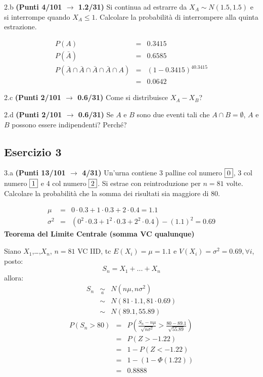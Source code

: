 \documentclass[
  11pt,
]{book}
\theoremstyle{mytheoremstyle}
\theoremstyle{mydefstyle}
\newenvironment{sol}
  {
  \begin{tcolorbox}[enhanced,breakable,arc=0.1mm,boxrule=1pt,colback=white,colframe=iblue,
  title=\bf \fontfamily{lmss}\selectfont \hspace{.5 cm} Soluzione,drop fuzzy shadow]

}{
\end{tcolorbox}
  }
\begin{document}
2.b \textbf{(Punti 4/101 \(\rightarrow\) 1.2/31)} Si continua ad estrarre da \(X_A\sim N(1.5,1.5)\) e si interrompe quando \(X_A\le 1\). Calcolare la probabilità di interrompere alla quinta estrazione.

\begin{sol}
\begin{eqnarray*}
  P(A) &=&  0.3415\\
  P(\bar A) &=& 0.6585\\
  P(\bar A\cap \bar A\cap\bar A\cap\bar A\cap A)&=& (1-0.3415)^40.3415\\
  &=& 0.0642
\end{eqnarray*}

\end{sol}

2.c \textbf{(Punti 2/101 \(\rightarrow\) 0.6/31)} Come si distribuisce \(X_A-X_B\)?

2.d \textbf{(Punti 2/101 \(\rightarrow\) 0.6/31)} Se \(A\) e \(B\) sono due eventi tali che \(A\cap B=\emptyset\), \(A\) e \(B\) possono essere indipendenti? Perché?

\subsection{Esercizio 3}\label{esercizio-3-25}

3.a \textbf{(Punti 13/101 \(\rightarrow\) 4/31)} Un'urna contiene 3 palline col numero \(\fbox{0}\), 3 col numero \(\fbox{1}\) e 4 col numero \(\fbox{2}\). Si estrae con reintroduzione per \(n=81\) volte.
Calcolare la probabilità che la somma dei risultati sia maggiore di 80.

\begin{sol}
\begin{eqnarray*}
 \mu &=&  0  \cdot 0.3+ 1  \cdot 0.3+ 2  \cdot 0.4 = 1.1 \\ \sigma^2 &=&(  0 ^2 \cdot 0.3+ 1 ^2 \cdot 0.3+ 2 ^2 \cdot 0.4 )-( 1.1 )^2= 0.69 \end{eqnarray*}\textbf{Teorema del Limite Centrale (somma VC qualunque)}

Siano \(X_1\),\ldots,\(X_n\), \(n=81\) VC IID, tc \(E(X_i)=\mu=1.1\) e \(V(X_i)=\sigma^2=0.69,\forall i\), posto:
\[
      S_n = X_1 + ... + X_n
      \]
allora:\begin{eqnarray*}
  S_n & \mathop{\sim}\limits_{a}& N(n\mu,n\sigma^2) \\
     &\sim & N(81\cdot1.1,81\cdot0.69) \\
     &\sim & N(89.1,55.89) 
  \end{eqnarray*}\begin{eqnarray*}
      P( S_n   >   80 ) 
        &=& P\left(  \frac { S_n  -  n\mu }{ \sqrt{n\sigma^2} }  >  \frac { 80  -  89.1 }{\sqrt{ 55.89 }} \right)  \\
                 &=& P\left(  Z   >   -1.22 \right) \\    &=& 1-P(Z< -1.22 )\\ 
                 &=&  1-(1-\Phi( 1.22 )) \\ &=&  0.8888 
      \end{eqnarray*}

\end{sol}
\end{document}
